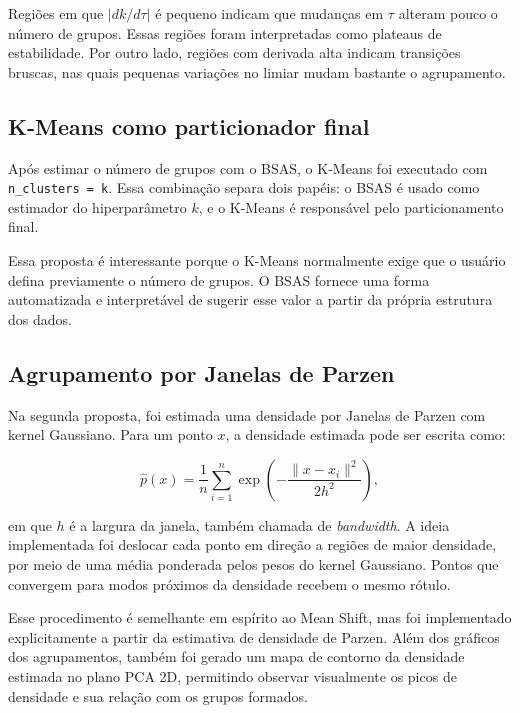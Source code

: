 \documentclass[12pt,a4paper]{article}
\begin{document}
Regiões em que $|dk/d\tau|$ é pequeno indicam que mudanças em $\tau$ alteram
pouco o número de grupos. Essas regiões foram interpretadas como plateaus de
estabilidade. Por outro lado, regiões com derivada alta indicam transições
bruscas, nas quais pequenas variações no limiar mudam bastante o agrupamento.

\subsection{K-Means como particionador final}

Após estimar o número de grupos com o BSAS, o K-Means foi executado com
\texttt{n\_clusters = k}. Essa combinação separa dois papéis: o BSAS é usado
como estimador do hiperparâmetro $k$, e o K-Means é responsável pelo
particionamento final.

Essa proposta é interessante porque o K-Means normalmente exige que o usuário
defina previamente o número de grupos. O BSAS fornece uma forma automatizada e
interpretável de sugerir esse valor a partir da própria estrutura dos dados.

\subsection{Agrupamento por Janelas de Parzen}

Na segunda proposta, foi estimada uma densidade por Janelas de Parzen com kernel
Gaussiano. Para um ponto $x$, a densidade estimada pode ser escrita como:

\begin{equation}
    \hat{p}(x) =
    \frac{1}{n}
    \sum_{i=1}^{n}
    \exp\left(
        -\frac{\lVert x - x_i \rVert^2}{2h^2}
    \right),
\end{equation}

em que $h$ é a largura da janela, também chamada de \textit{bandwidth}. A ideia
implementada foi deslocar cada ponto em direção a regiões de maior densidade,
por meio de uma média ponderada pelos pesos do kernel Gaussiano. Pontos que
convergem para modos próximos da densidade recebem o mesmo rótulo.

Esse procedimento é semelhante em espírito ao Mean Shift, mas foi implementado
explicitamente a partir da estimativa de densidade de Parzen. Além dos gráficos
dos agrupamentos, também foi gerado um mapa de contorno da densidade
estimada no plano PCA 2D, permitindo observar visualmente os picos de densidade
e sua relação com os grupos formados.
\end{document}
